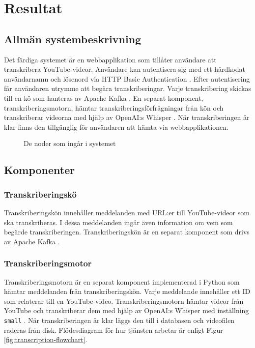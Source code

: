 \chapter{Resultat}
\label{ch:result}

\section{Allmän systembeskrivning}
\label{sec:general-system-description}
Det färdiga systemet är en webbapplikation som tillåter användare att
transkribera YouTube-videor. Användare kan autentisera sig med ett hårdkodat
användarnamn och lösenord via HTTP Basic Authentication \cite{RFC7617}. Efter
autentisering får användaren utrymme att begära transkriberingar. Varje
transkribering skickas till en kö som hanteras av Apache Kafka
\cite{ApacheKafka}. En separat komponent, transkriberingsmotorn, hämtar
transkriberingsförfrågningar från kön och transkriberar videorna med hjälp av
OpenAI:s Whisper \cite{OpenAIWhisper}. När transkriberingen är klar finns den
tillgänglig för användaren att hämta via webbapplikationen.

\begin{figure}[h]
    \centering
    
    \caption{De noder som ingår i systemet}
    \label{fig:system-nodes}
\end{figure}

\section{Komponenter}
\label{sec:components}

\subsection{Transkriberingskö}
\label{sec:transcription-queue}
Transkriberingskön innehåller meddelanden med URL:er till YouTube-videor som
ska transkriberas. I dessa meddelanden ingår även information om vem som
begärde transkriberingen. Transkriberingskön är en separat komponent som drivs
av Apache Kafka \cite{ApacheKafka}.

\subsection{Transkriberingsmotor}
\label{sec:transcription-engine}
Transkriberingsmotorn är en separat komponent implementerad i Python
\cite{PythonSoftwareFoundation2024} som hämtar meddelanden från
transkriberingskön. Varje meddelande innehåller ett ID som relaterar till en
YouTube-video. Transkriberingsmotorn hämtar videor från YouTube och
transkriberar dem med hjälp av OpenAI:s Whisper med inställning \verb|small|
\cite{OpenAIWhisper}. När transkriberingen är klar läggs den till i databasen
och videofilen raderas från disk. Flödesdiagram för hur tjänsten arbetar är
enligt Figur \ref{fig:transcription-flowchart}. 

